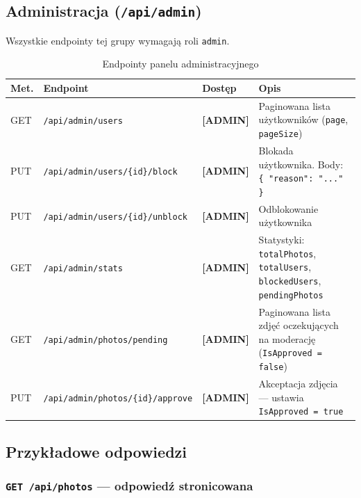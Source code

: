 \documentclass[12pt, a4paper]{article}
\begin{document}
\subsection{Administracja (\texttt{/api/admin})}

Wszystkie endpointy tej grupy wymagają roli \texttt{admin}.

\begin{table}[H]
  \centering
  \caption{Endpointy panelu administracyjnego}
  \begin{tabular}{@{}L{1.5cm}L{5.5cm}L{2cm}L{5cm}@{}}
    \toprule
    \textbf{Met.} & \textbf{Endpoint} & \textbf{Dostęp} & \textbf{Opis} \\
    \midrule
    GET & \texttt{/api/admin/users}                        & \textbf{[ADMIN]} & Paginowana lista użytkowników (\texttt{page}, \texttt{pageSize}) \\
    PUT & \texttt{/api/admin/users/\{id\}/block}           & \textbf{[ADMIN]} & Blokada użytkownika. Body: \texttt{\{ "reason": "..." \}} \\
    PUT & \texttt{/api/admin/users/\{id\}/unblock}         & \textbf{[ADMIN]} & Odblokowanie użytkownika \\
    GET & \texttt{/api/admin/stats}                        & \textbf{[ADMIN]} & Statystyki: \texttt{totalPhotos}, \texttt{totalUsers}, \texttt{blockedUsers}, \texttt{pendingPhotos} \\
    GET & \texttt{/api/admin/photos/pending}               & \textbf{[ADMIN]} & Paginowana lista zdjęć oczekujących na moderację (\texttt{IsApproved = false}) \\
    PUT & \texttt{/api/admin/photos/\{id\}/approve}        & \textbf{[ADMIN]} & Akceptacja zdjęcia --- ustawia \texttt{IsApproved = true} \\
    \bottomrule
  \end{tabular}
\end{table}

\subsection{Przykładowe odpowiedzi}

\subsubsection{\texttt{GET /api/photos} --- odpowiedź stronicowana}
\end{document}
